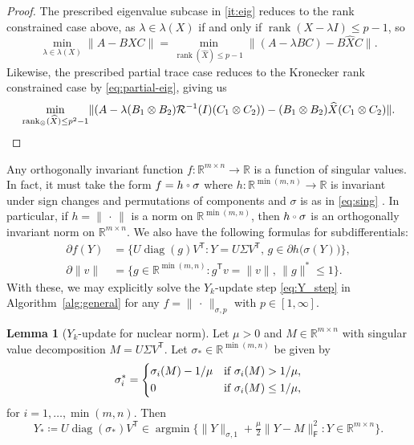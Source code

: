 \documentclass[11pt,reqno]{amsart}
\let\oh=\circ
\newcommand{\ccirc}{\mathbin{\mathchoice
  {\xcirc\scriptstyle}
  {\xcirc\scriptstyle}
  {\xcirc\scriptscriptstyle}
  {\xcirc\scriptscriptstyle}
}}
\newcommand{\xcirc}[1]{\vcenter{\hbox{$#1\oh$}}}
\let\circ\ccirc
\newcommand{\tp}{{\scriptscriptstyle\mathsf{T}}}
\newcommand{\st}{\sigma}
\newcommand{\F}{{\scriptscriptstyle\mathsf{F}}}
\DeclareMathOperator{\rank}{rank}
\DeclareMathOperator{\diag}{diag}
\DeclareMathOperator*{\argmin}{argmin}
\theoremstyle{definition}
\newtheorem{lemma}[theorem]{Lemma}
\numberwithin{equation}{section}
\newcommand{\R}{\mathbb{R}}
\begin{document}
\begin{proof}
The prescribed eigenvalue subcase in \ref{it:eig} reduces to the rank constrained case above, as $\lambda \in \lambda(X)$ if and only if $\rank(X -\lambda I)\le p-1$, so
\[
\min_{\lambda \in \lambda(X)} \lVert A - BXC \rVert = \min_{\rank(\widehat{X})\le p-1}\lVert (A -\lambda BC) - B\widehat{X}C \rVert.
\]
Likewise, the prescribed partial trace case reduces to the Kronecker rank constrained case by \eqref{eq:partial-eig}, giving us
\[
\min_{\rank_\otimes(\widehat{X})\le p^2-1} \lVert (A - \lambda (B_1 \otimes B_2)\mathcal{R}^{-1}(I)(C_1 \otimes C_2)) - (B_1 \otimes B_2)\widehat{X}(C_1 \otimes C_2) \rVert. \qedhere
\]
\end{proof}

Any orthogonally invariant function $f:\R^{m \times n} \to \R$ is a function of singular values. In fact, it must take the form $f = h \circ \sigma$ where  $h: \R^{\min(m,n)} \to \R$ is invariant under sign changes and permutations of components and $\sigma$ is as in \eqref{eq:sing} \cite{Lewis_UI}. In particular, if $h = \lVert \, \cdot \, \rVert$ is a norm on $\R^{\min(m,n)}$, then $h \circ \sigma$ is an orthogonally invariant norm on $\R^{m \times n}$. We also have the following formulas for subdifferentials:
\begin{align}
    \partial f(Y) &= \bigl\{U\diag(g)V^\tp : Y = U\Sigma V^\tp,\, g \in \partial h\bigl(\sigma(Y)\bigr) \bigr\}, \label{eq:uinorm_subdifferential} \\
    \partial\lVert v \rVert &= \{g \in \R^{\min(m,n)} : g^\tp v = \lVert v \rVert, \, \lVert g \rVert^* \le 1 \}. \label{eq:norm_sub}
\end{align} 
With these, we may explicitly solve the $Y_k$-update step \eqref{eq:Y_step} in Algorithm~\ref{alg:general} for any $f = \lVert \, \cdot \, \rVert_{\st, p}$ with $p \in [1,\infty]$.
\begin{lemma}[$Y_k$-update for nuclear norm]\label{lem:nuc}
Let $\mu>0$ and $M \in \R^{m \times n}$ with  singular value decomposition $M = U\Sigma V^\tp$. Let $\sigma_* \in \R^{\min(m,n)}$ be given by  
\[\sigma_i^* = 
\begin{dcases}
\sigma_i(M)-1/\mu  & \text{if } \sigma_i(M)>1/\mu,\\
0 & \text{if } \sigma_i(M)\le 1/\mu,
\end{dcases}
\]
for $i = 1,\dots, \min(m,n)$. Then
\[
Y_* \coloneqq U \diag(\sigma_*) V^\tp \in \argmin  \bigl\{ \lVert Y \rVert_{\st,1} + \tfrac{\mu}{2} \lVert Y - M \rVert_\F^2 : Y \in \R^{m \times n}\bigr\}.
\]
\end{lemma}
\end{document}
